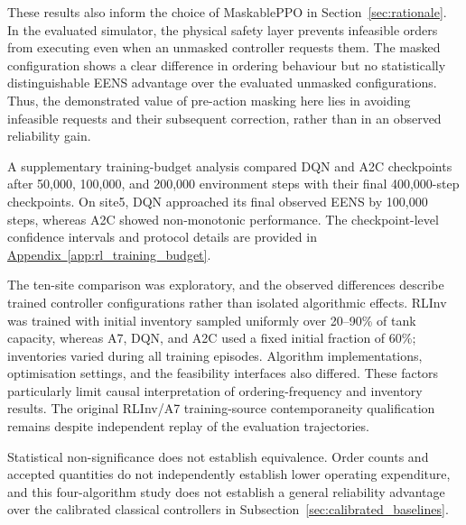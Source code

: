 \begin{revisedblock}
These results also inform the choice of MaskablePPO
in Section~\ref{sec:rationale}. In the evaluated
simulator, the physical safety layer prevents infeasible
orders from executing even when an unmasked controller
requests them. The masked configuration shows a clear
difference in ordering behaviour but no statistically
distinguishable EENS advantage over the evaluated
unmasked configurations. Thus, the demonstrated value
of pre-action masking here lies in avoiding infeasible
requests and their subsequent correction, rather than
in an observed reliability gain.
\end{revisedblock}

\begin{revisedblock}
A supplementary training-budget analysis compared
DQN and A2C checkpoints after 50,000, 100,000, and
200,000 environment steps with their final 400,000-step
checkpoints. On site5, DQN approached its final observed
EENS by 100,000 steps, whereas A2C showed non-monotonic
performance. The checkpoint-level confidence intervals
and protocol details are provided in
\hyperref[app:rl_training_budget]{Appendix~\ref*{app:rl_training_budget}}.
\end{revisedblock}

\begin{revisedblock}
The ten-site comparison was exploratory, and the
observed differences describe trained controller
configurations rather than isolated algorithmic effects.
RLInv was trained with initial inventory sampled uniformly
over 20--90\% of tank capacity, whereas A7, DQN, and A2C
used a fixed initial fraction of 60\%; inventories varied
during all training episodes. Algorithm implementations,
optimisation settings, and the feasibility interfaces also
differed. These factors particularly limit causal
interpretation of ordering-frequency and inventory results.
The original RLInv/A7 training-source contemporaneity
qualification remains despite independent replay of the
evaluation trajectories.
\end{revisedblock}

\begin{revisedblock}
Statistical non-significance does not establish
equivalence. Order counts and accepted quantities do
not independently establish lower operating expenditure,
and this four-algorithm study does not establish a general
reliability advantage over the calibrated classical
controllers in Subsection~\ref{sec:calibrated_baselines}.
\end{revisedblock}




